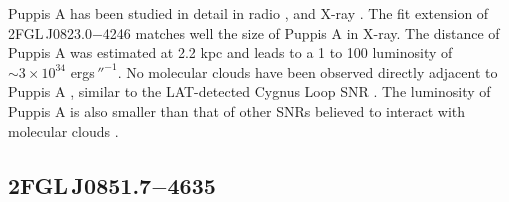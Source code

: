 Puppis A has been studied in detail in radio
\citep{castelletti_2006a_observations-puppis}, and  X-ray
\citep{petre_1996a_central-stellar,hwang_2008a_x-ray-emitting-ejecta}.
The fit extension of 2FGL\,J0823.0$-$4246 matches well the size of
Puppis A in X-ray.  The distance of Puppis A was estimated at 2.2 kpc
\citep{reynoso_1995a_observations-neutral,reynoso_2003a_observations-neutral}
and leads to a 1 \gev to 100 \gev luminosity of $\sim 3\times 10^{34}$
ergs$\,\second^{-1}$.  No molecular clouds have been observed directly
adjacent to Puppis A \citep{paron_2008a_high-resolution-observations},
similar to the LAT-detected Cygnus Loop SNR
\citep{katagiri_2011a_fermi-large}.  The luminosity of Puppis A is also
smaller than that of other SNRs believed to interact with molecular clouds
\citep{abdo_2009a_fermi-discovery,abdo_2010a_observation-supernova,abdo_2010a_gamma-ray-emission,abdo_2010d_fermi-large,abdo_2010a_fermi-lat-study}.

\subsection{2FGL\,J0851.7$-$4635}

